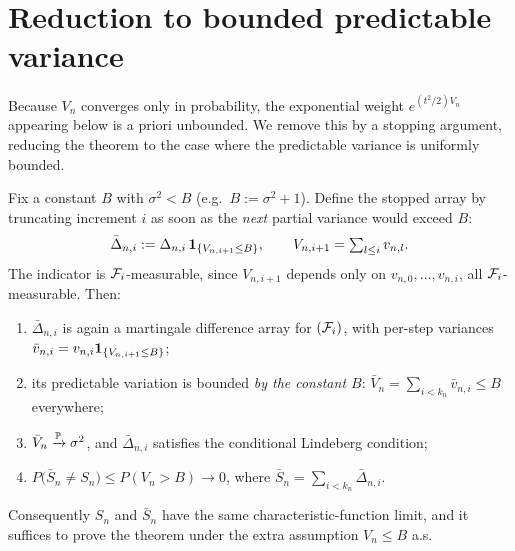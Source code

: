 \section{Reduction to bounded predictable variance}
\label{sec:pre_clt_trunc}

Because $V_n$ converges only in probability, the exponential weight
$e^{(t^2/2)V_n}$ appearing below is a priori unbounded. We remove this by a
stopping argument, reducing the theorem to the case where the predictable
variance is uniformly bounded.

\begin{lemma}\label{lem:clt_truncation}
\leanok
Fix a constant $B$ with $\sigma^2<B$ (e.g.\ $B:=\sigma^2+1$). Define the stopped
array by truncating increment $i$ as soon as the \emph{next} partial variance
would exceed $B$:
\[
  \bar\Delta_{n,i}:=\Delta_{n,i}\,\mathbf{1}_{\{V_{n,i+1}\le B\}},
  \qquad V_{n,i+1}=\textstyle\sum_{l\le i}v_{n,l}.
\]
The indicator is $\mathcal{F}_i$-measurable, since $V_{n,i+1}$ depends only on
$v_{n,0},\dots,v_{n,i}$, all $\mathcal{F}_i$-measurable. Then:
\begin{enumerate}
  \item[(i)] $\bar\Delta_{n,i}$ is again a martingale difference array for
        $(\mathcal{F}_i)$, with per-step variances
        $\bar v_{n,i}=v_{n,i}\mathbf{1}_{\{V_{n,i+1}\le B\}}$;
  \item[(ii)] its predictable variation is bounded \emph{by the constant $B$}:
        $\bar V_n=\sum_{i<k_n}\bar v_{n,i}\le B$ everywhere;
  \item[(iii)] $\bar V_n\xrightarrow{\mathbb{P}}\sigma^2$, and $\bar\Delta_{n,i}$
        satisfies the conditional Lindeberg condition;
  \item[(iv)] $P\big(\bar S_n\ne S_n\big)\le P(V_n>B)\to0$, where
        $\bar S_n=\sum_{i<k_n}\bar\Delta_{n,i}$.
\end{enumerate}
Consequently $S_n$ and $\bar S_n$ have the same characteristic-function limit, and
it suffices to prove the theorem under the extra assumption $V_n\le B$ a.s.
\end{lemma}

